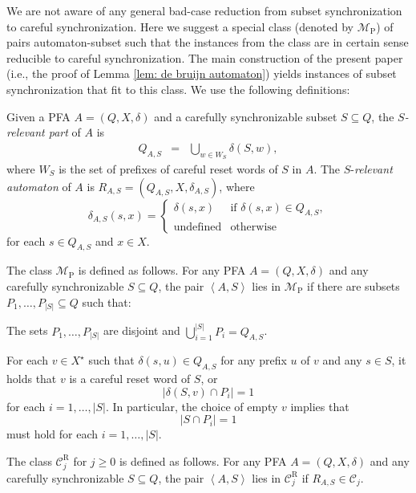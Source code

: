 \documentclass{ws-ijmpc}
\DeclareMathOperator{\und}{\mbox{undefined}}
\begin{document}
We are not aware of any general bad-case reduction from subset synchronization
to careful synchronization. Here we suggest a special class (denoted
by $\mathcal{M}_{\mathrm{P}}$) of pairs automaton-subset such that
the instances from the class are in certain sense reducible to careful
synchronization. The main construction of the present paper (i.e.,
the proof of Lemma \ref{lem: de bruijn automaton}) yields instances
of subset synchronization that fit to this class. We use the following
definitions:
\begin{itemlist}
\item Given a PFA $A=\left(Q,X,\delta\right)$ and a carefully synchronizable
subset $S\subseteq Q$, the $S$\emph{-relevant part} of $A$ is 
\begin{eqnarray*}
Q_{A,S} & = & \bigcup_{w\in W_{S}}\delta\!\left(S,w\right),
\end{eqnarray*}
where $W_{S}$ is the set of prefixes of careful reset words of $S$
in $A$. The $S$-\emph{relevant automaton }of $A$ is $R_{A,S}=\left(Q_{A,S},X,\delta_{A,S}\right)$,
where
\[
\delta_{A,S}\!\left(s,x\right)=\begin{cases}
\delta\!\left(s,x\right) & \mbox{if }\delta\!\left(s,x\right)\in Q_{A,S},\\
\und & \mbox{otherwise}
\end{cases}
\]
for each $s\in Q_{A,S}$ and $x\in X$.
\item The class $\mathcal{M}_{\mathrm{P}}$ is defined as follows. For any
PFA $A=\left(Q,X,\delta\right)$ and any carefully synchronizable
$S\subseteq Q$, the pair $\left\langle A,S\right\rangle $ lies in
$\mathcal{M}_{\mathrm{P}}$ if there are subsets $P_{1},\dots,P_{\left|S\right|}\subseteq Q$
such that:

\begin{itemlist}
\item The sets $P_{1},\dots,P_{\left|S\right|}$ are disjoint and $\bigcup_{i=1}^{\left|S\right|}P_{i}=Q_{A,S}$. 
\item For each $v\in X^{\star}$ such that $\delta\!\left(s,u\right)\in Q_{A,S}$
for any prefix $u$ of $v$ and any $s\in S$, it holds that $v$
is a careful reset word of $S$, or 
\[
\left|\delta\!\left(S,v\right)\cap P_{i}\right|=1
\]
for each $i=1,\dots,\left|S\right|$. In particular, the choice of
empty $v$ implies that 
\[
\left|S\cap P_{i}\right|=1
\]
must hold for each $i=1,\dots,\left|S\right|$.
\end{itemlist}
\item The class $\mathcal{C}_{j}^{\mathrm{R}}$ for $j\ge0$ is defined
as follows. For any PFA $A=\left(Q,X,\delta\right)$ and any carefully
synchronizable $S\subseteq Q$, the pair $\left\langle A,S\right\rangle $
lies in $\mathcal{C}_{j}^{\mathrm{R}}$ if $R_{A,S}\in\mathcal{C}_{j}$.\end{itemlist}
\end{document}
